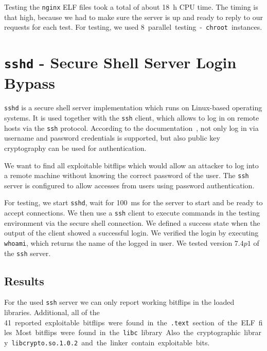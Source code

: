 Testing the \texttt{nginx} ELF files took a total of about \SI{18}{\hour} CPU
time. The timing is that high, because we had to make sure the server is up and
ready to reply to our requests for each test. For testing, we used \SI{8}
parallel testing-\texttt{chroot} instances.

\section{\texttt{sshd} - Secure Shell Server Login Bypass}

\texttt{sshd} is a secure shell server implementation which runs on Linux-based
operating systems. It is used together with the \texttt{ssh} client, which
allows to log in on remote hosts via the \texttt{ssh} protocol. According to the
documentation~\cite{sshman}, not only log in via username and password
credentials is supported, but also public key cryptography can be used for
authentication.

We want to find all exploitable bitflips which would allow an attacker to log
into a remote machine without knowing the correct password of the user. The
\texttt{ssh} server is configured to allow accesses from users using password
authentication.

For testing, we start \texttt{sshd}, wait for \SI{100}{\milli\second} for the
server to start and be ready to accept connections. We then use a \texttt{ssh}
client to execute commands in the testing environment via the secure shell
connection. We defined a success state when the output of the client showed a
successful login. We verified the login by executing \texttt{whoami}, which
returns the name of the logged in user. We tested version $7.4p1$ of the
\texttt{ssh} server.

\subsection{Results}

For the used \texttt{ssh} server we can only report working bitflips in the
loaded libraries. Additional, all of the \SI{41} reported exploitable bitflips
were found in the \texttt{.text} section of the ELF files. Most bitflips were
found in the \texttt{libc} library. Also the cryptographic library
\texttt{libcrypto.so.1.0.2} and the linker contain exploitable bits.


